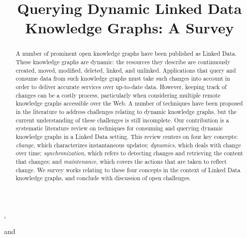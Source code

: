 \documentclass[sw]{iosart2x}
\begin{document}
\begin{frontmatter}

\title{Querying Dynamic Linked Data Knowledge Graphs: A Survey}

\author[A]{ },
\author[B]{ }
and
\author[A]{ }
\address[A]{IMFD Chile; Department of Computer Science, , }
\address[B]{,
Southampton, }

\begin{abstract}
A number of prominent open knowledge graphs have been published as Linked Data. These knowledge graphs are dynamic: the resources they describe are continuously created, moved, modified, deleted, linked, and unlinked. Applications that query and consume data from such knowledge graphs must take such changes into account in order to deliver accurate services over up-to-date data. However, keeping track of changes can be a costly process, particularly when considering multiple remote knowledge graphs accessible over the Web. A number of techniques have been proposed in the literature to address challenges relating to dynamic knowledge graphs, but the current understanding of these challenges is still incomplete. Our contribution is a systematic literature review on techniques for consuming and querying dynamic knowledge graphs in a Linked Data setting. This review centers on four key concepts: \textit{change}, which characterizes instantaneous updates; \textit{dynamics}, which deals with change over time; \textit{synchronization}, which refers to detecting changes and retrieving the content that changes; and \textit{maintenance}, which covers the actions that are taken to reflect change. We survey works relating to these four concepts in the context of Linked Data knowledge graphs, and conclude with discussion of open challenges.
\end{abstract}

\begin{keyword}
\end{keyword}

\end{frontmatter}
\end{document}
